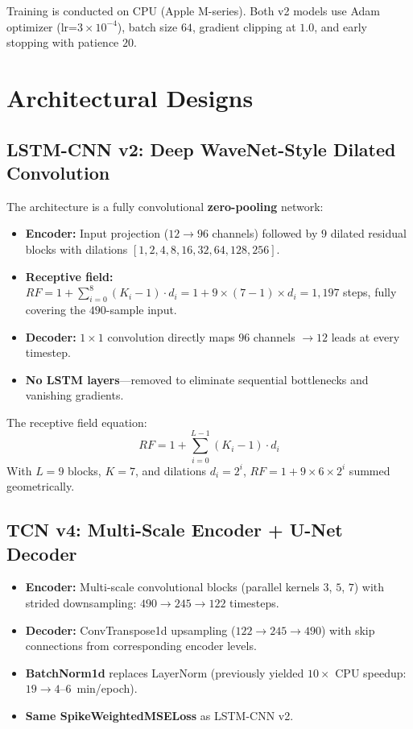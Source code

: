 \documentclass[10pt,journal,compsoc]{IEEEtran}
\begin{document}
\noindent Training is conducted on CPU (Apple M-series). Both v2 models use Adam optimizer (lr=$3\times 10^{-4}$), batch size $64$, gradient clipping at $1.0$, and early stopping with patience $20$.

\section{Architectural Designs}

\subsection{LSTM-CNN v2: Deep WaveNet-Style Dilated Convolution}
\label{sec:wn}

The architecture is a fully convolutional \textbf{zero-pooling} network:
\begin{itemize}
    \item \textbf{Encoder:} Input projection ($12 \to 96$ channels) followed by $9$ dilated residual blocks with dilations $[1, 2, 4, 8, 16, 32, 64, 128, 256]$.
    \item \textbf{Receptive field:} $RF = 1 + \sum_{i=0}^{8}(K_i - 1)\cdot d_i = 1 + 9 \times (7-1) \times d_i = 1{,}197$ steps, fully covering the $490$-sample input.
    \item \textbf{Decoder:} $1\times 1$ convolution directly maps $96$ channels $\to 12$ leads at every timestep.
    \item \textbf{No LSTM layers}---removed to eliminate sequential bottlenecks and vanishing gradients.
\end{itemize}
The receptive field equation:
\begin{equation}
    RF = 1 + \sum_{i=0}^{L-1} (K_i - 1) \cdot d_i
\end{equation}
With $L=9$ blocks, $K=7$, and dilations $d_i = 2^i$, $RF = 1 + 9 \times 6 \times 2^i$ summed geometrically.

\subsection{TCN v4: Multi-Scale Encoder + U-Net Decoder}
\label{sec:tcn}
\begin{itemize}
    \item \textbf{Encoder:} Multi-scale convolutional blocks (parallel kernels $3$, $5$, $7$) with strided downsampling: $490 \to 245 \to 122$ timesteps.
    \item \textbf{Decoder:} ConvTranspose1d upsampling ($122 \to 245 \to 490$) with skip connections from corresponding encoder levels.
    \item \textbf{BatchNorm1d} replaces LayerNorm (previously yielded $10\times$ CPU speedup: $19 \to 4$--$6$~min/epoch).
    \item \textbf{Same SpikeWeightedMSELoss} as LSTM-CNN v2.
\end{itemize}
\end{document}

